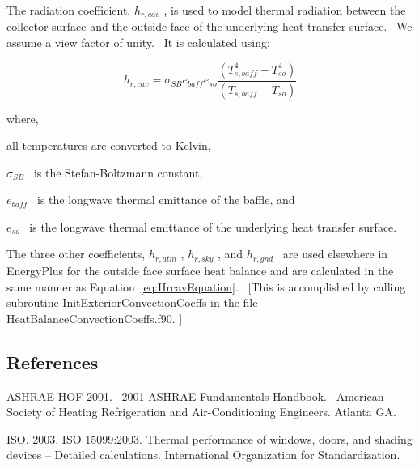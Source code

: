 The radiation coefficient, \({h_{r,cav}}\) , is used to model thermal radiation between the collector surface and the outside face of the underlying heat transfer surface.~ We assume a view factor of unity.~ It is calculated using:

\begin{equation}
{h_{r,cav}} = {\sigma_{SB}}{e_{baff}}{e_{so}}\frac{{\left( {T_{s,baff}^4 - T_{so}^4} \right)}}{{\left( {{T_{s,baff}} - {T_{so}}} \right)}}
\label{eq:HrcavEquation}
\end{equation}

where,

all temperatures are converted to Kelvin,

\({\sigma_{SB}}\) ~is the Stefan-Boltzmann constant,

\({e_{baff}}\) ~is the longwave thermal emittance of the baffle, and

\({e_{so}}\) ~is the longwave thermal emittance of the underlying heat transfer surface.

The three other coefficients, \({h_{r,atm}}\) , \({h_{r,sky}}\) , and \({h_{r,gnd}}\) ~are used elsewhere in EnergyPlus for the outside face surface heat balance and are calculated in the same manner as Equation~\ref{eq:HrcavEquation}.~ {[}This is accomplished by calling subroutine InitExteriorConvectionCoeffs in the file HeatBalanceConvectionCoeffs.f90. {]}

\subsection{References}\label{references-023}

ASHRAE HOF 2001.~ 2001 ASHRAE Fundamentals Handbook.~ American Society of Heating Refrigeration and Air-Conditioning Engineers. Atlanta GA.

ISO. 2003. ISO 15099:2003. Thermal performance of windows, doors, and shading devices -- Detailed calculations. International Organization for Standardization.

